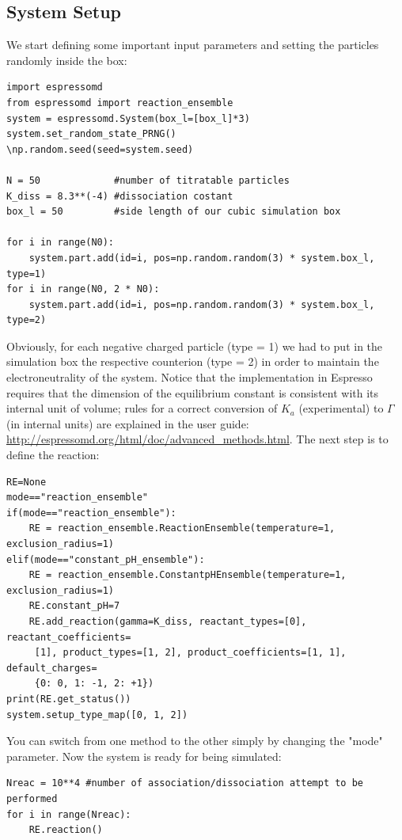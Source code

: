 \documentclass[
a4paper,                        %
11pt,                           %
twoside,                        %
footsepline,                    %
headsepline,                    %
headexclude,                    %
footexclude,                    %
pagesize,                       %
]{scrartcl}
\begin{document}
\subsection{System Setup}

We start defining some important input parameters and setting the particles randomly inside the box:
\begin{verbatim}
import espressomd
from espressomd import reaction_ensemble
system = espressomd.System(box_l=[box_l]*3)
system.set_random_state_PRNG()
\np.random.seed(seed=system.seed)

N = 50             #number of titratable particles
K_diss = 8.3**(-4) #dissociation costant 
box_l = 50         #side length of our cubic simulation box 

for i in range(N0):
    system.part.add(id=i, pos=np.random.random(3) * system.box_l, type=1)
for i in range(N0, 2 * N0):
    system.part.add(id=i, pos=np.random.random(3) * system.box_l, type=2)
\end{verbatim}

Obviously, for each negative charged  particle (type = 1) we had to put in the simulation box the respective counterion  (type = 2) in order to maintain the electroneutrality of the system.
Notice that the implementation in Espresso requires that the dimension of the equilibrium constant is consistent with its internal unit of volume; rules for a correct conversion of $K_a$ (experimental) to $\Gamma$ (in internal units) are explained in the user guide: \url{http://espressomd.org/html/doc/advanced_methods.html}. The next step is to define the reaction:

\begin{verbatim}
RE=None
mode=="reaction_ensemble"
if(mode=="reaction_ensemble"):
    RE = reaction_ensemble.ReactionEnsemble(temperature=1, exclusion_radius=1)
elif(mode=="constant_pH_ensemble"):
    RE = reaction_ensemble.ConstantpHEnsemble(temperature=1, exclusion_radius=1)
    RE.constant_pH=7
    RE.add_reaction(gamma=K_diss, reactant_types=[0], reactant_coefficients=
     [1], product_types=[1, 2], product_coefficients=[1, 1], default_charges=
     {0: 0, 1: -1, 2: +1})
print(RE.get_status())
system.setup_type_map([0, 1, 2])
\end{verbatim}
You can switch from one method to the other simply by changing the "mode" parameter. Now the system is ready for being simulated:

\begin{verbatim}
Nreac = 10**4 #number of association/dissociation attempt to be performed
for i in range(Nreac):
    RE.reaction()
\end{verbatim}
\end{document}
